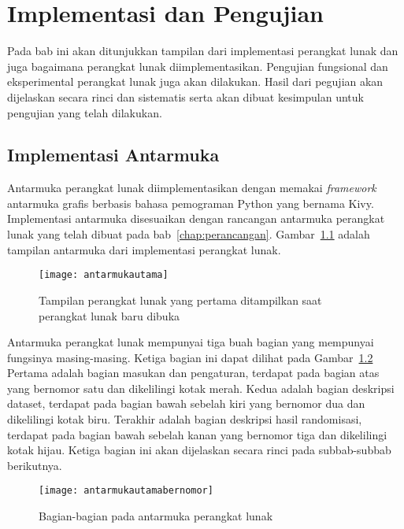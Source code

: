 \chapter{Implementasi dan Pengujian}
\label{chap:implementasi}

Pada bab ini akan ditunjukkan tampilan dari implementasi perangkat lunak dan juga bagaimana perangkat lunak diimplementasikan. Pengujian fungsional dan eksperimental perangkat lunak juga akan dilakukan. Hasil dari pegujian akan dijelaskan secara rinci dan sistematis serta akan dibuat kesimpulan untuk pengujian yang telah dilakukan.

\section{Implementasi Antarmuka}
\label{sec:implementasi-antarmuka}

Antarmuka perangkat lunak diimplementasikan dengan memakai \textit{framework} antarmuka grafis berbasis bahasa pemograman Python yang bernama Kivy. Implementasi antarmuka disesuaikan dengan rancangan antarmuka perangkat lunak yang telah dibuat pada bab~\ref{chap:perancangan}. Gambar~\ref{fig:antarmukautama} adalah tampilan antarmuka dari implementasi perangkat lunak.

\begin{figure}
	\centering
	\texttt{[image: antarmukautama]}
	\caption{Tampilan perangkat lunak yang pertama ditampilkan saat perangkat lunak baru dibuka}
	\label{fig:antarmukautama}
\end{figure}

Antarmuka perangkat lunak mempunyai tiga buah bagian yang mempunyai fungsinya masing-masing. Ketiga bagian ini dapat dilihat pada Gambar~\ref{fig:antarmukautamabernomor} Pertama adalah bagian masukan dan pengaturan, terdapat pada bagian atas yang bernomor satu dan dikelilingi kotak merah. Kedua adalah bagian deskripsi dataset, terdapat pada bagian bawah sebelah kiri yang bernomor dua dan dikelilingi kotak biru. Terakhir adalah bagian deskripsi hasil randomisasi, terdapat pada bagian bawah sebelah kanan yang bernomor tiga dan dikelilingi kotak hijau. Ketiga bagian ini akan dijelaskan secara rinci pada subbab-subbab berikutnya.

\begin{figure}
	\centering
	\texttt{[image: antarmukautamabernomor]}
	\caption{Bagian-bagian pada antarmuka perangkat lunak}
	\label{fig:antarmukautamabernomor}
\end{figure}

